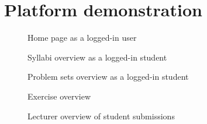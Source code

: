 \chapter{Platform demonstration} \label{chap:images}
\begin{figure}[H]
    \centering
    \caption{Home page as a logged-in user}
    \label{fig:Home page}
\end{figure}

\begin{figure}[H]
    \centering
    \caption{Syllabi overview as a logged-in student}
    \label{fig:syllabi}
\end{figure}

\begin{figure}[H]
    \centering
    \caption{Problem sets overview as a logged-in student}
    \label{fig:problemsets}
\end{figure}

\begin{figure}[H]
    \centering
    \caption{Exercise overview}
    \label{fig:exercise_overview}
\end{figure}

\begin{figure}[H]
    \centering
    \caption{Lecturer overview of student submissions}
    \label{fig:teacher_overview.}
\end{figure}